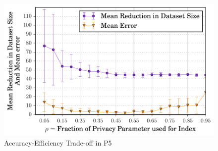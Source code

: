 \begin{figure}[b]
  \includegraphics[width=0.6\columnwidth]{index_new.pdf}
  \caption{Accuracy-Efficiency Trade-off in P5 } \label{fig:index_tradeoff}
\end{figure}


